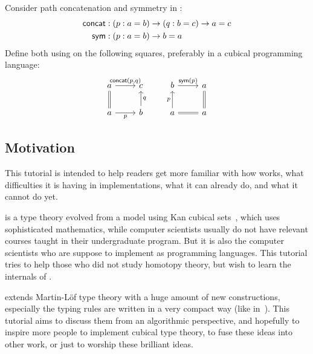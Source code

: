 \begin{exercise}\label{ex:concat-sym}
Consider path concatenation and symmetry in \CTT{}:
\begin{align*}
\textsf{concat}&:(p:a=b)\to(q:b=c)\to{a=c}\\
\textsf{sym}&:(p:a=b)\to{b=a}
\end{align*}
Define both using \hcomp{} on the following squares,
preferably in a cubical programming language:
\[\begin{tikzcd}
	a & c & b & a \\
	a & b & a & a
	\arrow["{\concat(p, q)}", from=1-1, to=1-2]
	\arrow[Rightarrow, no head, from=2-1, to=1-1]
	\arrow["p"', from=2-1, to=2-2]
	\arrow["q"', from=2-2, to=1-2]
	\arrow["p", from=2-3, to=1-3]
	\arrow[Rightarrow, no head, from=2-3, to=2-4]
	\arrow[Rightarrow, no head, from=2-4, to=1-4]
	\arrow["{\sym(p)}", from=1-3, to=1-4]
\end{tikzcd}\]
\end{exercise}
\subsection{Motivation}
This tutorial is intended to help readers get more familiar with how
\CTT{} works, what difficulties it is having in implementations,
what it can already do, and what it cannot do yet.

\CTT{} is a type theory evolved from a model using Kan cubical sets~\cite{CubicalSets},
which uses sophisticated mathematics, while computer scientists
usually do not have relevant courses taught in their undergraduate program.
But it is also the computer scientists who are suppose to implement \CTT{} as
programming languages. This tutorial tries to help those who did not study homotopy
theory, but wish to learn the internals of \CTT.

\CTT{} extends Martin-L\"{o}f type theory with a huge amount of new constructions,
especially the typing rules are written in a very compact way (like in~\cite{HCompPDF}).
This tutorial aims to discuss them from an algorithmic perspective,
and hopefully to inspire more people to implement cubical type theory,
to fuse these ideas into other work, or just to worship these brilliant ideas.

